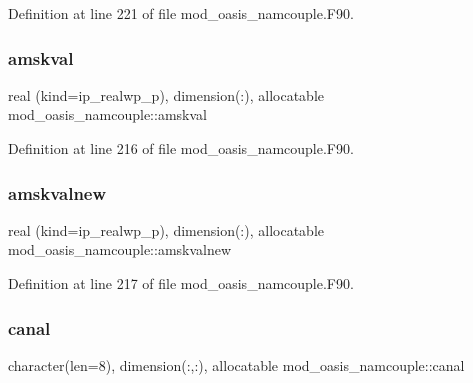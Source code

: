Definition at line 221 of file mod\+\_\+oasis\+\_\+namcouple.\+F90.

\mbox{\label{namespacemod__oasis__namcouple_a92d43fa5eaaff81f0e3f73b303377c02}} 
\subsubsection{\texorpdfstring{amskval}{amskval}}
{\footnotesize\ttfamily real (kind=ip\+\_\+realwp\+\_\+p), dimension(\+:), allocatable mod\+\_\+oasis\+\_\+namcouple\+::amskval\hspace{0.3cm}{\ttfamily [private]}}



Definition at line 216 of file mod\+\_\+oasis\+\_\+namcouple.\+F90.

\mbox{\label{namespacemod__oasis__namcouple_a3598202174da65117caf675065f8b160}} 
\subsubsection{\texorpdfstring{amskvalnew}{amskvalnew}}
{\footnotesize\ttfamily real (kind=ip\+\_\+realwp\+\_\+p), dimension(\+:), allocatable mod\+\_\+oasis\+\_\+namcouple\+::amskvalnew\hspace{0.3cm}{\ttfamily [private]}}



Definition at line 217 of file mod\+\_\+oasis\+\_\+namcouple.\+F90.

\mbox{\label{namespacemod__oasis__namcouple_a5eaa67fd4db1a3cde074adedd984ffbe}} 
\subsubsection{\texorpdfstring{canal}{canal}}
{\footnotesize\ttfamily character(len=8), dimension(\+:,\+:), allocatable mod\+\_\+oasis\+\_\+namcouple\+::canal\hspace{0.3cm}{\ttfamily [private]}}



